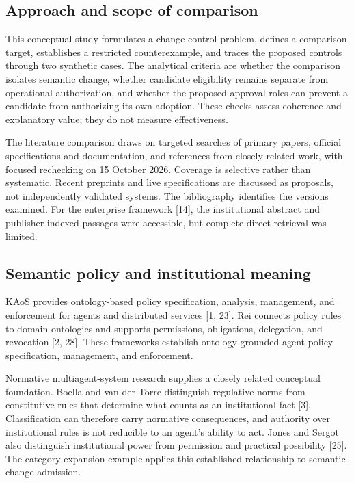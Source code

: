 \documentclass[
  english,
  12pt,
  a4paper,
  preprint,
  numbers,
  nopreprintline]{elsarticle}
\begin{document}
\subsection{Approach and scope of
comparison}\label{approach-and-scope-of-comparison}

This conceptual study formulates a change-control problem, defines a
comparison target, establishes a restricted counterexample, and traces
the proposed controls through two synthetic cases. The analytical
criteria are whether the comparison isolates semantic change, whether
candidate eligibility remains separate from operational authorization,
and whether the proposed approval roles can prevent a candidate from
authorizing its own adoption. These checks assess coherence and
explanatory value; they do not measure effectiveness.

The literature comparison draws on targeted searches of primary papers,
official specifications and documentation, and references from closely
related work, with focused rechecking on 15 October 2026. Coverage is
selective rather than systematic. Recent preprints and live
specifications are discussed as proposals, not independently validated
systems. The bibliography identifies the versions examined. For the
enterprise framework {[}14{]}, the institutional abstract and
publisher-indexed passages were accessible, but complete direct
retrieval was limited.

\subsection{Semantic policy and institutional
meaning}\label{semantic-policy-and-institutional-meaning}

KAoS provides ontology-based policy specification, analysis, management,
and enforcement for agents and distributed services {[}1, 23{]}. Rei
connects policy rules to domain ontologies and supports permissions,
obligations, delegation, and revocation {[}2, 28{]}. These frameworks
establish ontology-grounded agent-policy specification, management, and
enforcement.

Normative multiagent-system research supplies a closely related
conceptual foundation. Boella and van der Torre distinguish regulative
norms from constitutive rules that determine what counts as an
institutional fact {[}3{]}. Classification can therefore carry normative
consequences, and authority over institutional rules is not reducible to
an agent's ability to act. Jones and Sergot also distinguish
institutional power from permission and practical possibility {[}25{]}.
The category-expansion example applies this established relationship to
semantic-change admission.
\end{document}
